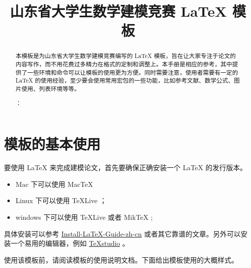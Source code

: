 \documentclass[withoutpreface,bwprint]{main} %
\title{山东省大学生数学建模竞赛 \LaTeX{} 模板}
\begin{document}
 \maketitle
 \begin{abstract}
本模板是为山东省大学生数学建模竞赛编写的 \LaTeX{} 模板，旨在让大家专注于论文的内容写作，而不用花费过多精力在格式的定制和调整上。本手册是相应的参考，其中提供了一些环境和命令可以让模板的使用更为方便。同时需要注意，使用者需要有一定的 \LaTeX{} 的使用经验，至少要会使用常用宏包的一些功能，比如参考文献、数学公式、图片使用、列表环境等等。



：

\end{abstract}

\tableofcontents

\newpage

\section{模板的基本使用}

要使用 \LaTeX{} 来完成建模论文，首先要确保正确安装一个 \LaTeX{} 的发行版本。

\begin{itemize}
    \item Mac 下可以使用 Mac\TeX{}
    \item Linux 下可以使用 \TeX{}Live ；
    \item windows 下可以使用 \TeX{}Live 或者 Mik\TeX{} ;
\end{itemize}

具体安装可以参考 \href{https://github.com/OsbertWang/install-latex-guide-zh-cn/releases/}{Install-LaTeX-Guide-zh-cn} 或者其它靠谱的文章。另外可以安装一个易用的编辑器，例如 \href{https://mirrors.tuna.tsinghua.edu.cn/github-release/texstudio-org/texstudio/LatestRelease/}{\TeX{}studio} 。

使用该模板前，请阅读模板的使用说明文档。下面给出模板使用的大概样式。
\end{document}
